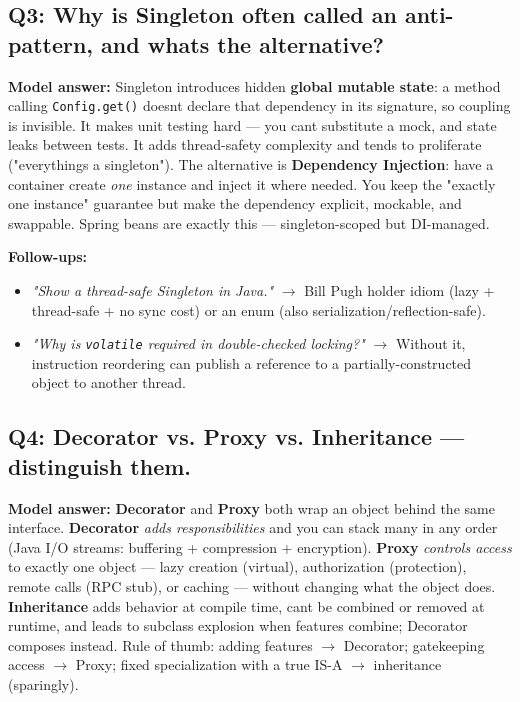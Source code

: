 \documentclass[11pt]{article}
\providecommand{\tightlist}{\setlength{\itemsep}{1pt}\setlength{\parskip}{0pt}}
\begin{document}
\subsection{Q3: Why is Singleton often called an anti-pattern, and what\textquotesingle s the alternative?}\label{q3-why-is-singleton-often-called-an-anti-pattern-and-whats-the-alternative}

\textbf{Model answer:} Singleton introduces hidden \textbf{global mutable state}: a method calling \texttt{Config.get()} doesn\textquotesingle t declare that dependency in its signature, so coupling is invisible. It makes unit testing hard --- you can\textquotesingle t substitute a mock, and state leaks between tests. It adds thread-safety complexity and tends to proliferate ("everything\textquotesingle s a singleton"). The alternative is \textbf{Dependency Injection}: have a container create \emph{one} instance and inject it where needed. You keep the "exactly one instance" guarantee but make the dependency explicit, mockable, and swappable. Spring beans are exactly this --- singleton-scoped but DI-managed.

\textbf{Follow-ups:}

\begin{itemize}
\tightlist
\item
  \emph{"Show a thread-safe Singleton in Java."} \(\rightarrow\) Bill Pugh holder idiom (lazy + thread-safe + no sync cost) or an enum (also serialization/reflection-safe).
\item
  \emph{"Why is \texttt{volatile} required in double-checked locking?"} \(\rightarrow\) Without it, instruction reordering can publish a reference to a partially-constructed object to another thread.
\end{itemize}

\subsection{Q4: Decorator vs. Proxy vs. Inheritance --- distinguish them.}\label{q4-decorator-vs-proxy-vs-inheritance--distinguish-them}

\textbf{Model answer:} \textbf{Decorator} and \textbf{Proxy} both wrap an object behind the same interface. \textbf{Decorator} \emph{adds responsibilities} and you can stack many in any order (Java I/O streams: buffering + compression + encryption). \textbf{Proxy} \emph{controls access} to exactly one object --- lazy creation (virtual), authorization (protection), remote calls (RPC stub), or caching --- without changing what the object does. \textbf{Inheritance} adds behavior at compile time, can\textquotesingle t be combined or removed at runtime, and leads to subclass explosion when features combine; Decorator composes instead. Rule of thumb: adding features \(\rightarrow\) Decorator; gatekeeping access \(\rightarrow\) Proxy; fixed specialization with a true IS-A \(\rightarrow\) inheritance (sparingly).
\end{document}
